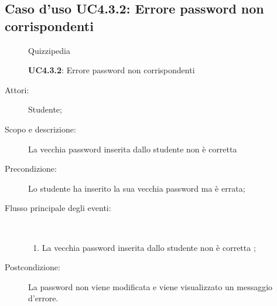 \subsection{Caso d'uso UC4.3.2: Errore password non corrispondenti}
	\begin{figure}[H]
		\centering
		\begin{resizedtikzpicture}{\textwidth}
		\begin{umlsystem}[x=0, fill=lightgray!20]{Quizzipedia}
		\end{umlsystem}
		\end{resizedtikzpicture}
		\caption{\textbf{UC4.3.2}: Errore password non corrispondenti}
		\label{UC4.3.2}
	\end{figure}
\begin{description}
\item[Attori:] Studente;
\item[Scopo e descrizione:] La vecchia password inserita dallo studente non è corretta
      \item[Precondizione:] Lo studente ha inserito la sua vecchia password ma è errata;

        \item[Flusso principale degli eventi:] \ 
 \begin{enumerate}
          \item La vecchia password inserita dallo studente non è corretta
;

      \end{enumerate}
    \item[Postcondizione:] La password non viene modificata e viene visualizzato un messaggio d'errore.
  \end{description}
\hypertarget{UC4.4}{}

